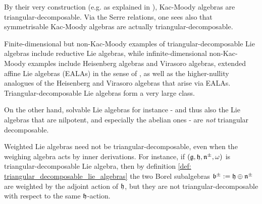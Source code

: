         \begin{example}
            By their very construction (e.g. as explained in \cite[Theorem 1.2]{kac_infinite_dimensional_lie_algebras}), Kac-Moody algebras are triangular-decomposable. Via the Serre relations, one sees also that symmetrisable Kac-Moody algebras are actually triangular-decomposable.
            
            Finite-dimensional but non-Kac-Moody examples of triangular-decomposable Lie algebras include reductive Lie algebras, while infinite-dimensional non-Kac-Moody examples include Heisenberg algebras and Virasoro algebras, extended affine Lie algebras (EALAs) in the sense of \cite{neher_lectures_on_EALAs}, as well as the higher-nullity analogues of the Heisenberg and Virasoro algebras that arise via EALAs. Triangular-decomposable Lie algebras form a very large class.

            On the other hand, solvable Lie algebras for instance - and thus also the Lie algebras that are nilpotent, and especially the abelian ones - are \textit{not} triangular decomposable.
        \end{example}
        \begin{example}
            Weighted Lie algebras need not be triangular-decomposable, even when the weighing algebra acts by inner derivations. For instance, if $(\mathfrak{g}, \mathfrak{h}, \mathfrak{n}^{\pm}, \omega)$ is triangular-decomposable Lie algebra, then by definition \ref{def: triangular_decomposable_lie_algebras} the two Borel subalgebras $\mathfrak{b}^{\pm} := \mathfrak{h} \oplus \mathfrak{n}^{\pm}$ are weighted by the adjoint action of $\mathfrak{h}$, but they are not triangular-decomposable with respect to the same $\mathfrak{h}$-action.
        \end{example}


